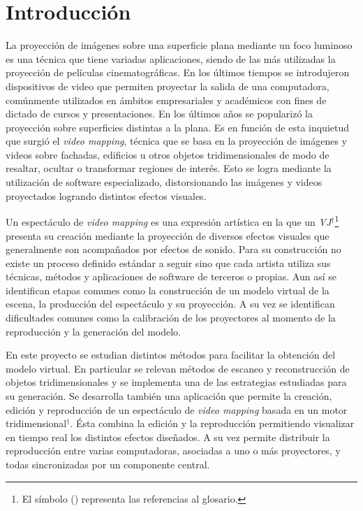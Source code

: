 ﻿\chapter{Introducción}


La proyección de imágenes sobre una superficie plana mediante un foco luminoso es una técnica que tiene variadas aplicaciones, siendo de las más utilizadas la proyección de películas cinematográficas. En los últimos tiempos se introdujeron dispositivos de video que permiten proyectar la salida de una computadora, comúnmente utilizados en ámbitos empresariales y académicos con fines de dictado de cursos y presentaciones. En los últimos años se popularizó la proyección sobre superficies distintas a la plana.%
Es en función de esta inquietud que surgió el \emph{video mapping}, técnica que se basa en la proyección de imágenes y videos sobre fachadas, edificios u otros objetos tridimensionales de modo de resaltar, ocultar o transformar regiones de interés. %
Esto se logra mediante la utilización de software especializado, distorsionando las imágenes y videos proyectados logrando distintos efectos visuales.

Un espectáculo de \emph{video mapping} es una expresión artística en la que un \emph{VJ}$^\dagger$\footnote{El símbolo (\dag) representa las referencias al glosario.} presenta su creación mediante la proyección de diversos efectos visuales que generalmente son acompañados por efectos de sonido. Para su construcción no existe un proceso definido estándar a seguir sino que cada artista utiliza sus técnicas, métodos y aplicaciones de software de terceros o propias. Aun así se identifican etapas comunes como la construcción de un modelo virtual de la escena, la producción del espectáculo y su proyección. A su vez se identifican dificultades comunes como la calibración de los proyectores al momento de la reproducción y la generación del modelo.

En este proyecto se estudian distintos métodos para facilitar la obtención del modelo virtual. En particular se relevan métodos de escaneo y reconstrucción de objetos tridimensionales y se implementa una de las estrategias estudiadas para su generación.%
Se desarrolla también una aplicación que permite la creación, edición y reproducción de un espectáculo de \emph{video mapping} basada en un motor tridimensional$^\dagger$. Ésta combina la edición y la reproducción permitiendo visualizar en tiempo real los distintos efectos diseñados. A su vez permite distribuir la reproducción entre varias computadoras, asociadas a uno o más proyectores, y todas sincronizadas por un componente central.

